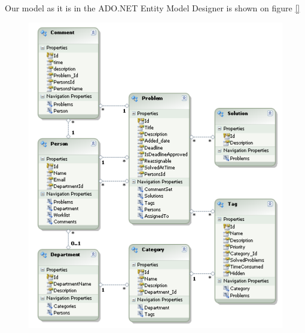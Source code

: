 Our model as it is in the ADO.NET Entity Model Designer is shown on figure \ref{}
\begin{figure}
	\centering
		\includegraphics[scale=0.8]{input/implementation/mvc/Model.pdf}
	\label{fig:balanceWorkloadDiagram}
\end{figure}





 
 
 
 
